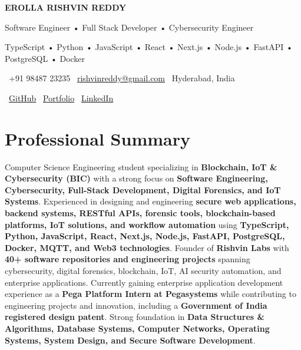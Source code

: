 \documentclass[a4paper,11pt]{article}
\begin{document}

\begin{center}

{\Huge \textbf{EROLLA RISHVIN REDDY}}

\vspace{4pt}

{\large Software Engineer • Full Stack Developer • Cybersecurity Engineer}

\vspace{5pt}

{\small
TypeScript • Python • JavaScript • React • Next.js • Node.js • FastAPI • PostgreSQL • Docker
}

\vspace{8pt}

\small
\faPhone\ +91 98487 23235 \hspace{12pt}
\faEnvelope\ \href{mailto:rishvinreddy@gmail.com}{rishvinreddy@gmail.com}
\hspace{12pt}
\faMapMarker*\ Hyderabad, India

\vspace{6pt}

\faGithub\
\href{https://github.com/RishvinReddy}{GitHub}
\hspace{14pt}
\faGlobe\
\href{https://rishvinreddy.vercel.app}{Portfolio}
\hspace{14pt}
\faLinkedin\
\href{https://www.linkedin.com/in/rishvinreddy/}{LinkedIn}

\end{center}

\vspace{-8pt}





\section{Professional Summary}

Computer Science Engineering student specializing in \textbf{Blockchain, IoT \& Cybersecurity (BIC)} with a strong focus on \textbf{Software Engineering, Cybersecurity, Full-Stack Development, Digital Forensics, and IoT Systems}. Experienced in designing and engineering \textbf{secure web applications, backend systems, RESTful APIs, forensic tools, blockchain-based platforms, IoT solutions, and workflow automation} using \textbf{TypeScript, Python, JavaScript, React, Next.js, Node.js, FastAPI, PostgreSQL, Docker, MQTT, and Web3 technologies}. Founder of \textbf{Rishvin Labs} with \textbf{40+ software repositories and engineering projects} spanning cybersecurity, digital forensics, blockchain, IoT, AI security automation, and enterprise applications. Currently gaining enterprise application development experience as a \textbf{Pega Platform Intern at Pegasystems} while contributing to engineering projects and innovation, including a \textbf{Government of India registered design patent}. Strong foundation in \textbf{Data Structures \& Algorithms, Database Systems, Computer Networks, Operating Systems, System Design, and Secure Software Development}.
\end{document}
